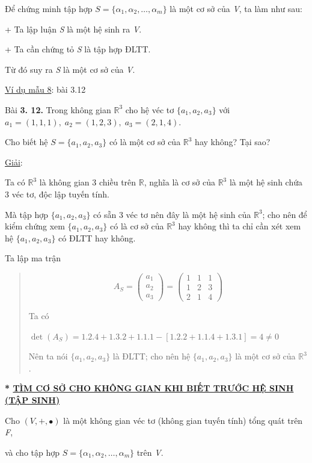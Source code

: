 \documentclass[12pt,a4paper]{article}
\newcommand{\ul}[1]{\uline{#1}}
\begin{document}
Để chứng minh tập hợp $S = \{\alpha_1, \alpha_2, \dots, \alpha_m\}$
là một cơ sở của \emph{V}, ta làm như sau:

+ Ta lập luận \emph{S} là một hệ sinh ra \emph{V}.

+ Ta cần chứng tỏ \emph{S} là tập hợp ĐLTT.

Từ đó suy ra \emph{S} là một cơ sở của \emph{V}.

\ul{Ví dụ mẫu 8}: bài 3.12

Bài \textbf{3. 12.} Trong không gian $\mathbb{R}^3$ cho hệ véc tơ $\{a_1, a_2, a_3\}$ với
$a_1 = (1, 1, 1), \; a_2 = (1, 2, 3), \; a_3 = (2, 1, 4).$

Cho biết hệ $S = \{ a_1, a_2, a_3 \}$ có là một
cơ sở của $\mathbb{R}^3$ hay không?
Tại sao?

\ul{Giải}:

Ta có $\mathbb{R}^3$ là không gian 3
chiều trên $\mathbb{R}$, nghĩa là
cơ sở của $\mathbb{R}^3$ là một hệ
sinh chứa 3 véc tơ, độc lập tuyến tính.

Mà tập hợp $\{ a_1, a_2, a_3 \}$ có sẵn 3
véc tơ nên đây là một hệ sinh của
$\mathbb{R}^3$; cho nên để kiểm chứng
xem $\{ a_1, a_2, a_3 \}$ có là cơ sở của
$\mathbb{R}^3$ hay không thì ta chỉ
cần xét xem hệ $\{ a_1, a_2, a_3 \}$ có ĐLTT
hay không.

Ta lập ma trận

\begin{quote}
\[A_S = \begin{pmatrix} a_1 \\ a_2 \\ a_3 \end{pmatrix} = \begin{pmatrix} 1 & 1 & 1 \\ 1 & 2 & 3 \\ 2 & 1 & 4 \end{pmatrix}\]

Ta có

$\det(A_S) = 1.2.4 + 1.3.2 + 1.1.1 - [1.2.2 + 1.1.4 + 1.3.1] = 4 \ne 0$

Nên ta nói $\{ a_1, a_2, a_3 \}$ là ĐLTT;
cho nên hệ $\{ a_1, a_2, a_3 \}$ là một cơ
sở của $\mathbb{R}^3$.
\end{quote}

\textbf{* \ul{TÌM CƠ SỞ CHO KHÔNG GIAN KHI BIẾT TRƯỚC HỆ SINH (TẬP
SINH)}}

Cho $(V, +, \bullet)$ là một không gian
véc tơ (không gian tuyến tính) tổng quát trên \emph{F},

và cho tập hợp $S = \{\alpha_1, \alpha_2, \dots, \alpha_m\}$ trên
\emph{V}.
\end{document}
